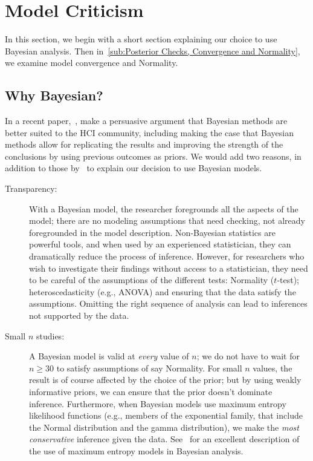 \section{Model Criticism}
\label{sec:Model Criticism}

In this section, we  begin with a short section explaining our choice to use Bayesian analysis. Then in~\ref{sub:Posterior Checks, Convergence and Normality}, we examine model convergence and Normality.


\subsection{Why Bayesian?}
\label{sub:Why Bayesian?}
In a recent paper,~\textcite{Kay2016}, make a persuasive argument that Bayesian methods are better suited to the HCI community, including making the case that Bayesian methods allow for replicating the results and improving the strength of the conclusions by using previous outcomes as priors. We would add two reasons, in addition to those by~\textcite{Kay2016} to explain our decision to use Bayesian models. 
\begin{description}
    \item[Transparency:] With a Bayesian model, the researcher foregrounds all the aspects of the model; there are no modeling assumptions that need checking, not already foregrounded in the model description. Non-Bayesian statistics are powerful tools, and when used by an experienced statistician, they can dramatically reduce the process of inference. However, for researchers who wish to investigate their findings without access to a statistician, they need to be careful of the assumptions of the different tests: Normality ($t$-test); heteroscedasticity (e.g., ANOVA) and ensuring that the data satisfy the assumptions. Omitting the right sequence of analysis can lead to inferences not supported by the data.
    \item[Small $n$ studies:] A Bayesian model is valid at \textit{every} value of $n$; we do not have to wait for $n\geq 30$ to satisfy assumptions of say Normality. For small $n$ values, the result is of course affected by the choice of the prior; but by using weakly informative priors, we can ensure that the prior doesn't dominate inference. Furthermore, when Bayesian models use maximum entropy likelihood functions (e.g., members of the exponential family, that include the Normal distribution and the gamma distribution), we make the \textit{most conservative} inference given the data. See~\textcite[][Chapter 9]{McElreath2015} for an excellent description of the use of maximum entropy models in Bayesian analysis.
\end{description}


